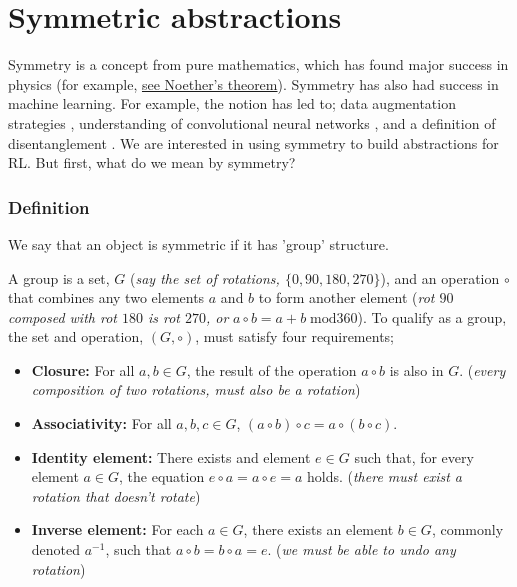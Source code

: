 \newpage
\section{Symmetric abstractions}\label{symmetric-abstractions}

Symmetry is a concept from pure mathematics, which has found major success in physics (for example, \href{https://en.wikipedia.org/wiki/Noether%27s_theorem}{see Noether's theorem}).
Symmetry has also had success in machine learning. For example, the notion has led to;
data augmentation strategies \cite{Simard2003},
understanding of convolutional neural networks \cite{Cohen2017}, and a definition of disentanglement \cite{Higgins2018}.
We are interested in using symmetry to build abstractions for RL. But first, what do we mean by symmetry?




\subsubsection{Definition}

We say that an object is symmetric if it has 'group' structure.

A group is a set, $G$ (\textit{say the set of rotations, $\{0, 90, 180, 270\}$}),
and an operation $\circ$ that combines any two elements $a$ and $b$ to form
another element (\textit{rot $90$ composed with rot $180$ is rot $270$, or} $a \circ b = a + b \;\text{mod} 360$).
To qualify as a group, the set and operation, $(G, \circ)$, must satisfy four requirements;

\begin{itemize}
	\tightlist
	\item \textbf{Closure:} For all $a, b \in G$, the result of the operation $a \circ b$ is also in $G$. (\textit{every composition of two rotations, must also be a rotation})
	\item \textbf{Associativity:} For all $a,b,c \in G$, $(a\circ b) \circ c = a\circ (b\circ c)$.
	\item \textbf{Identity element:} There exists and element $e\in G$ such that, for every element $a\in G$, the equation $e\circ a = a\circ e = a$ holds. (\textit{there must exist a rotation that doesn't rotate})
	\item \textbf{Inverse element:} For each $a \in G$, there exists an element $b \in G$, commonly denoted $a^{−1}$, such that $a \circ b = b \circ a = e$. (\textit{we must be able to undo any rotation})
\end{itemize}



